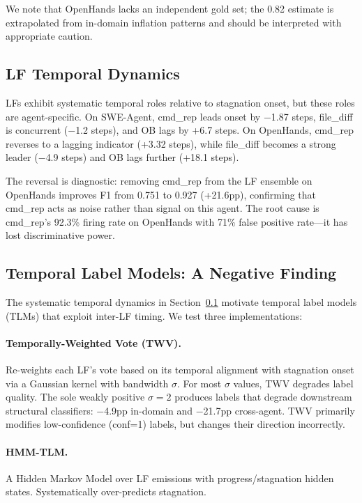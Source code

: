 \documentclass[11pt]{article}
\begin{document}
We note that OpenHands lacks an independent gold set; the 0.82 estimate is extrapolated from in-domain inflation patterns and should be interpreted with appropriate caution.

\subsection{LF Temporal Dynamics}
\label{sec:temporal}

LFs exhibit systematic temporal roles relative to stagnation onset, but these roles are agent-specific.
On SWE-Agent, cmd\_rep leads onset by $-$1.87 steps, file\_diff is concurrent ($-$1.2 steps), and OB lags by +6.7 steps.
On OpenHands, cmd\_rep reverses to a lagging indicator (+3.32 steps), while file\_diff becomes a strong leader ($-$4.9 steps) and OB lags further (+18.1 steps).

The reversal is diagnostic: removing cmd\_rep from the LF ensemble on OpenHands improves F1 from 0.751 to 0.927 (+21.6pp), confirming that cmd\_rep acts as noise rather than signal on this agent.
The root cause is cmd\_rep's 92.3\% firing rate on OpenHands with 71\% false positive rate---it has lost discriminative power.

\subsection{Temporal Label Models: A Negative Finding}
\label{sec:tlm}

The systematic temporal dynamics in Section~\ref{sec:temporal} motivate temporal label models (TLMs) that exploit inter-LF timing.
We test three implementations:

\paragraph{Temporally-Weighted Vote (TWV).} Re-weights each LF's vote based on its temporal alignment with stagnation onset via a Gaussian kernel with bandwidth $\sigma$.
For most $\sigma$ values, TWV degrades label quality.
The sole weakly positive $\sigma{=}2$ produces labels that degrade downstream structural classifiers: $-$4.9pp in-domain and $-$21.7pp cross-agent.
TWV primarily modifies low-confidence (conf=1) labels, but changes their direction incorrectly.

\paragraph{HMM-TLM.} A Hidden Markov Model over LF emissions with progress/stagnation hidden states.
Systematically over-predicts stagnation.
\end{document}
